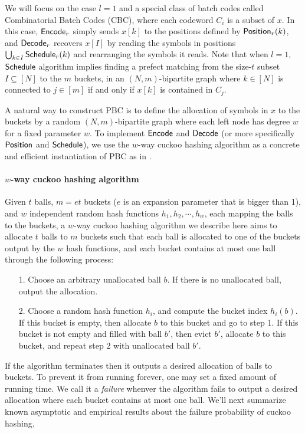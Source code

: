 We will focus on the case $l=1$ and a special class of batch codes called Combinatorial Batch Codes (CBC)\cite{cryptoeprint:2017/1142,10.1145/1007352.1007396,cryptoeprint:2008/306}, where each codeword $C_i$ is a subset of $x$. In this case, ${\sf Encode}_r$ simply sends $x[k]$ to the positions defined by ${\sf Position}_r(k)$, and ${\sf Decode}_r$ recovers $x[I]$ by reading the symbols in positions $\bigcup_{k\in I}{\sf Schedule}_r(k)$ and rearranging the symbols it reads. Note that when $l=1$, ${\sf Schedule}$ algorithm implies finding a prefect matching from the size-$t$ subset $I\subseteq[N]$ to the $m$ buckets, in an $(N,m)$-bipartite graph where $k\in[N]$ is connected to $j\in[m]$ if and only if $x[k]$ is contained in $C_j$. 

A natural way to construct PBC is to define the allocation of symbols in $x$ to the buckets by a random $(N,m)$-bipartite graph where each left node has degree $w$ for a fixed parameter $w$. To implement ${\sf Encode}$ and ${\sf Decode}$ (or more specifically ${\sf Position}$ and ${\sf Schedule}$), we use the $w$-way cuckoo hashing algorithm\cite{10.1007/3-540-44676-1_10} as a concrete and efficient instantiation of PBC as in \cite{cryptoeprint:2017/1142,cryptoeprint:2018/579,yeo_cuckoo_2023}. 

\paragraph{$w$-way cuckoo hashing algorithm}Given $t$ balls, $m=et$ buckets ($e$ is an expansion parameter that is bigger than 1), and $w$ independent random hash functions $h_1, h_2,\cdots, h_w$, each mapping the balls to the buckets, a $w$-way cuckoo hashing algorithm we describe here aims to allocate $t$ balls to $m$ buckets such that each ball is allocated to one of the buckets output by the $w$ hash functions, and each bucket contains at most one ball through the following process: 
\begin{itemize}
  \item[1.] Choose an arbitrary unallocated ball $b$. If there is no unallocated ball, output the allocation. 
  \item[2.] Choose a random hash function $h_i$, and  compute the bucket index $h_i(b)$. If this bucket is empty, then allocate $b$ to this bucket and go to step 1. If this bucket is not empty and filled with ball $b'$, then evict $b'$, allocate $b$ to this bucket,  and repeat step 2 with unallocated ball $b'$. 
\end{itemize}
If the algorithm terminates then it outputs a desired allocation of balls to buckets. To prevent it from running forever, one may set a fixed amount of running time. We call it a \emph{failure} whenver the algorithm fails to output a desired allocation where each bucket contains at most one ball. We'll next summarize known asymptotic and empirical results about the failure probability of cuckoo hashing. 

